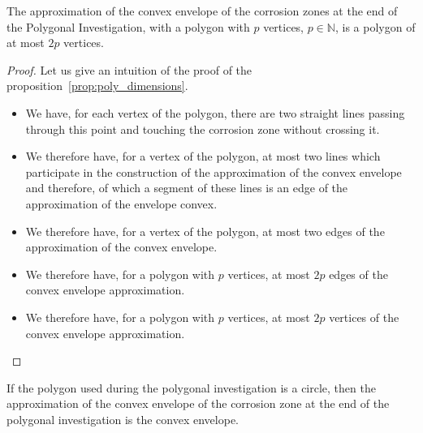 \begin{proposition}
	The approximation of the convex envelope of the corrosion zones at the end of the Polygonal Investigation, with a polygon with $p$ vertices, $p \in \mathbb{N}$, is a polygon of at most $2 p$ vertices.
	\label{prop:poly_dimensions}
\end{proposition}
\begin{proof}
	Let us give an intuition of the proof of the proposition~\ref{prop:poly_dimensions}.
	\begin{itemize}
		\item We have, for each vertex of the polygon, there are two straight lines passing through this point and touching the corrosion zone without crossing it.
		\item We therefore have, for a vertex of the polygon, at most two lines which participate in the construction of the approximation of the convex envelope and therefore, of which a segment of these lines is an edge of the approximation of the envelope convex.
		\item We therefore have, for a vertex of the polygon, at most two edges of the approximation of the convex envelope.
		\item We therefore have, for a polygon with $p$ vertices, at most $2p$ edges of the convex envelope approximation.
		\item We therefore have, for a polygon with $p$ vertices, at most $2p$ vertices of the convex envelope approximation.
	\end{itemize}
\end{proof}

\begin{conjecture}
	If the polygon used during the polygonal investigation is a circle, then the approximation of the convex envelope of the corrosion zone at the end of the polygonal investigation is the convex envelope.
	\label{prop:circle}
\end{conjecture}

